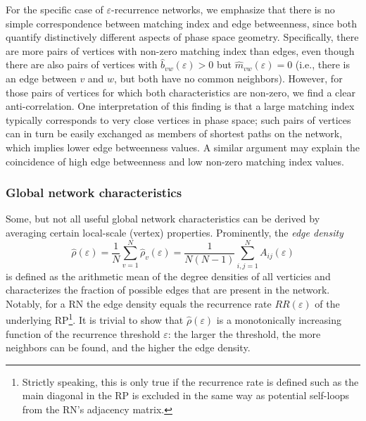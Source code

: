 For the specific case of $\varepsilon$-recurrence networks, we emphasize that there is no simple correspondence between matching index and edge betweenness, since both quantify distinctively different aspects of phase space geometry. Specifically, there are more pairs of vertices with non-zero matching index than edges, even though there are also pairs of vertices with $\hat{b}_{vw}(\varepsilon)>0$ but $\hat{m}_{vw}(\varepsilon)=0$ (i.e., there is an edge between $v$ and $w$, but both have no common neighbors). However, for those pairs of vertices for which both characteristics are non-zero, we find a clear anti-correlation. One interpretation of this finding is that a large matching index typically corresponds to very close vertices in phase space; such pairs of vertices can in turn be easily exchanged as members of shortest paths on the network, which implies lower edge betweenness values. A similar argument may explain the coincidence of high edge betweenness and low non-zero matching index values.
        
        
        
		\subsubsection{Global network characteristics}

Some, but not all useful global network characteristics can be derived by averaging certain local-scale (vertex) properties. Prominently, the \textit{edge density}
\begin{equation}
\hat{\rho}(\varepsilon)=\frac{1}{N}\sum_{v=1}^N \hat{\rho}_v(\varepsilon)=\frac{1}{N(N-1)} \sum_{i,j=1}^N A_{ij}(\varepsilon)
\label{eq:edgedensity}
\end{equation}
\noindent
is defined as the arithmetic mean of the degree densities of all verticies and characterizes the fraction of possible edges that are present in the network. Notably, for a RN the edge density equals the recurrence rate $RR(\varepsilon)$ of the underlying RP\footnote{Strictly speaking, this is only true if the recurrence rate is defined such as the main diagonal in the RP is excluded in the same way as potential self-loops from the RN's adjacency matrix.}. It is trivial to show that $\hat{\rho}(\varepsilon)$ is a monotonically increasing function of the recurrence threshold $\varepsilon$: the larger the threshold, the more neighbors can be found, and the higher the edge density.

